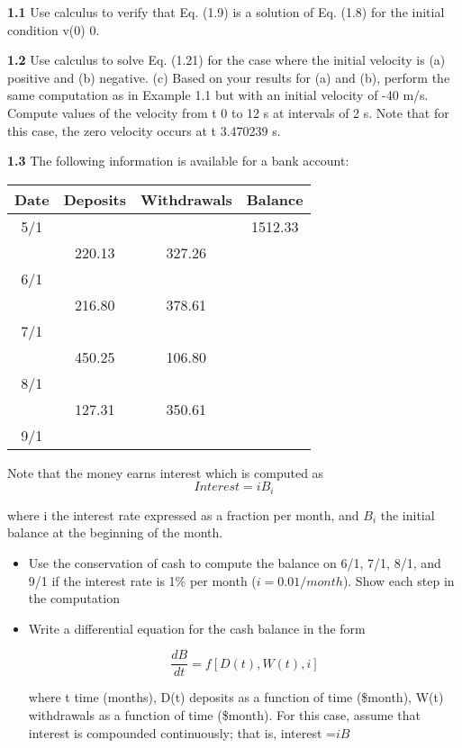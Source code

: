 \documentclass[../main.tex]{subfiles}
\begin{document}
\begin{multicols}{2}
	
	\textbf{1.1} Use calculus to verify that Eq. (1.9) is a solution of
Eq. (1.8) for the initial condition v(0)  0.


\textbf{1.2} Use calculus to solve Eq. (1.21) for the case where the initial velocity is (a) positive and (b) negative. (c) Based on your
results for (a) and (b), perform the same computation as in Example 1.1 but with an initial velocity of -40 m/s. Compute
values of the velocity from t  0 to 12 s at intervals of 2 s. Note
that for this case, the zero velocity occurs at t  3.470239 s.


\textbf{1.3} The following information is available for a bank account:

\begin{table}[H]
	
		\begin{tabular}{cccc }
			\hline
			Date &Deposits& Withdrawals &Balance\\
			\hline
			5/1&&& 1512.33\\
			&220.13& 327.26&\\
			6/1&&&\\
			&216.80& 378.61&\\
			7/1&&&\\
			&450.25 &106.80&\\
			8/1&&&\\
			&127.31 &350.61&\\
			9/1&&&\\
			\hline
		\end{tabular}
\end{table}

Note that the money earns interest which is computed as
$$Interest = i B_i $$

where i  the interest rate expressed as a fraction per month,
and $B_i$ the initial balance at the beginning of the month.
\begin{itemize}
	\item Use the conservation of cash to compute the balance on
	6/1, 7/1, 8/1, and 9/1 if the interest rate is 1\% per month
	($i =  0.01/month$). Show each step in the computation
	\item Write a differential equation for the cash balance in the
	form

	$$\dfrac{dB}{dt}=f[D(t), W(t), i  ]$$

	where t  time (months), D(t)  deposits as a function
of time (\$\/month), W(t)  withdrawals as a function of
time (\$\/month). For this case, assume that interest  is
compounded continuously; that is, interest  =$iB$


\end{itemize}
\end{multicols}
\end{document}
